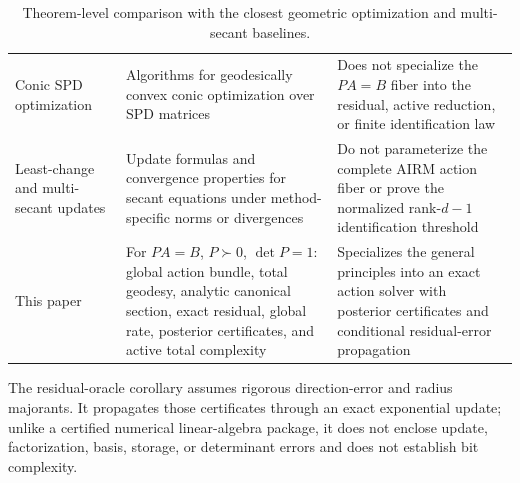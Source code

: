 \begin{table}[ht]
\begin{tabular}{@{}p{}p{}p{}@{}}
Conic SPD optimization \cite{sra2015conic}
& Algorithms for geodesically convex conic optimization over SPD matrices
& Does not specialize the \(PA=B\) fiber into the residual, active reduction,
or finite identification law \\

Least-change and multi-secant updates
\cite{dennis1979leastchange,schnabel1983multiple,fletcher1991variational,
gao2018block,boutet2022grouped,kanamori2013bregman}
& Update formulas and convergence properties for secant equations under
method-specific norms or divergences
& Do not parameterize the complete AIRM action fiber or prove the normalized
rank-\(d-1\) identification threshold \\

This paper
& For \(PA=B\), \(P\succ0\), \(\det P=1\): global action bundle, total
geodesy, analytic canonical section, exact
residual, global rate, posterior certificates, and active total complexity
& Specializes the general principles into an exact action solver with
posterior certificates and conditional residual-error propagation \\
\bottomrule
\end{tabular}
\endgroup
\caption{Theorem-level comparison with the closest geometric optimization and
multi-secant baselines.}
\label{tab:theorem-level-comparison}
\end{table}

The residual-oracle corollary assumes rigorous direction-error and radius
majorants.  It propagates those certificates through an exact exponential
update; unlike a certified numerical linear-algebra package, it does not
enclose update, factorization, basis, storage, or determinant errors and does
not establish bit complexity.
